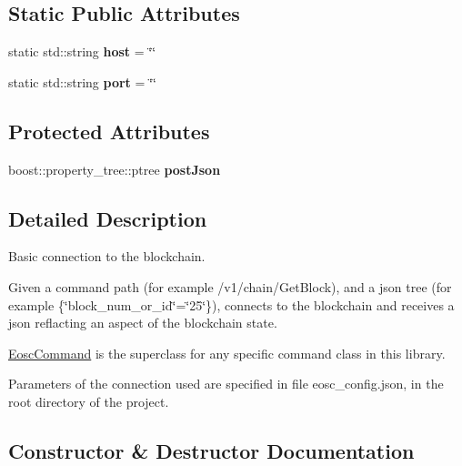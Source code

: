 \subsection*{Static Public Attributes}
\begin{DoxyCompactItemize}
\item 
\mbox{\label{classtokenika_1_1eosc_1_1_eosc_command_a82163846139ac5fd47ffe3cb68251d4e}} 
static std\+::string {\bfseries host} = \char`\"{}\char`\"{}
\item 
\mbox{\label{classtokenika_1_1eosc_1_1_eosc_command_a8a10e9cc90a957a70f40a63c37581452}} 
static std\+::string {\bfseries port} = \char`\"{}\char`\"{}
\end{DoxyCompactItemize}
\subsection*{Protected Attributes}
\begin{DoxyCompactItemize}
\item 
\mbox{\label{classtokenika_1_1eosc_1_1_eosc_command_a1642782c91f4877a8fba395324fb7337}} 
boost\+::property\+\_\+tree\+::ptree {\bfseries post\+Json}
\end{DoxyCompactItemize}


\subsection{Detailed Description}
Basic connection to the blockchain. 

Given a command path (for example {\ttfamily /v1/chain/\+Get\+Block}), and a json tree (for example \{\char`\"{}block\+\_\+num\+\_\+or\+\_\+id\char`\"{}=\char`\"{}25\char`\"{}\}), connects to the blockchain and receives a json reflacting an aspect of the blockchain state.

{\ttfamily \hyperlink{classtokenika_1_1eosc_1_1_eosc_command}{Eosc\+Command}} is the superclass for any specific command class in this library.

Parameters of the connection used are specified in file {\ttfamily eosc\+\_\+config.\+json}, in the root directory of the project. 

\subsection{Constructor \& Destructor Documentation}
\mbox{\label{classtokenika_1_1eosc_1_1_eosc_command_ab736f0dcd8ca14eb0daf9b2244218397}} 
